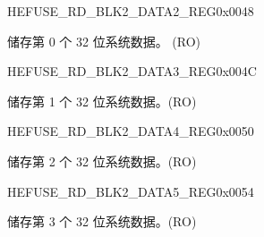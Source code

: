 \begin{register}{H}{EFUSE\_RD\_BLK2\_DATA2\_REG}{0x0048}\label{regdesc:EFUSERDBLK2DATA2REG}
%
\regnewline%
\begin{regdesc}\begin{reglist}
\label{fielddesc:EFUSESYSDATA1}\item [EFUSE\_SYS\_DATA1] 储存第 0 个 32 位系统数据。 (RO)
\end{reglist}\end{regdesc}
\end{register}


\begin{register}{H}{EFUSE\_RD\_BLK2\_DATA3\_REG}{0x004C}\label{regdesc:EFUSERDBLK2DATA3REG}
%
\regnewline%
\begin{regdesc}\begin{reglist}
\label{fielddesc:EFUSESYSDATA2}\item [EFUSE\_SYS\_DATA2] 储存第 1 个 32 位系统数据。(RO)
\end{reglist}\end{regdesc}
\end{register}


\begin{register}{H}{EFUSE\_RD\_BLK2\_DATA4\_REG}{0x0050}\label{regdesc:EFUSERDBLK2DATA4REG}
%
\regnewline%
\begin{regdesc}\begin{reglist}
\label{fielddesc:EFUSESYSDATA3}\item [EFUSE\_SYS\_DATA3]储存第 2 个 32 位系统数据。(RO)
\end{reglist}\end{regdesc}
\end{register}


\begin{register}{H}{EFUSE\_RD\_BLK2\_DATA5\_REG}{0x0054}\label{regdesc:EFUSERDBLK2DATA5REG}
%
\regnewline%
\begin{regdesc}\begin{reglist}
\label{fielddesc:EFUSESYSDATA4}\item [EFUSE\_SYS\_DATA4] 储存第 3 个 32 位系统数据。(RO)
\end{reglist}\end{regdesc}
\end{register}


